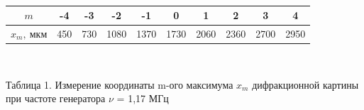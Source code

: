 \

\newline

\begin{center}
\begin{tabular}{|c|c|c|c|c|c|c|c|c|c|}
\hline
$m$ &-4&-3&-2&-1&0&1&2&3&4\\
\hline
$x_m, \ мкм$ &450&730& 1080&1370&1730&2060&2360&2700&2950\\
\hline
\end{tabular}

\

\newline

Таблица 1. Измерение координаты m-ого максимума $x_m$ дифракционной картины при частоте генератора $\nu$ = 1,17 МГц
\end{center}
	
\

\newline

